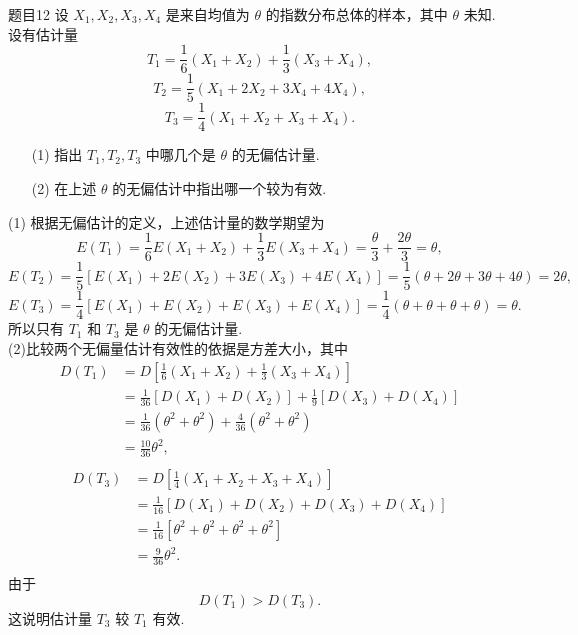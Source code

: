 \begin{question}{题目12}
    设 $X_1,X_2,X_3,X_4$ 是来自均值为 $\theta$ 的指数分布总体的样本，其中 $\theta$ 未知. 设有估计量
    $$
        T_1 = \frac{1}{6}(X_1 + X_2) + \frac{1}{3}(X_3 + X_4),
    $$
    $$
        T_2 = \frac{1}{5}(X_1 + 2X_2 + 3X_4 + 4X_4),
    $$
    $$
        T_3 = \frac{1}{4}(X_1 + X_2 + X_3 + X_4).
    $$
    \begin{enumerate}
        \item [(1)] 指出 $T_1, T_2, T_3$ 中哪几个是 $\theta$ 的无偏估计量.
        \item [(2)] 在上述 $\theta$ 的无偏估计中指出哪一个较为有效.
    \end{enumerate}
\end{question}
\begin{solution}
    (1) 根据无偏估计的定义，上述估计量的数学期望为
    $$
        E(T_1) = \frac{1}{6}E(X_1 + X_2) + \frac{1}{3}E(X_3 + X_4) = \frac{\theta}{3} + \frac{2\theta}{3} = \theta,
    $$
    $$
        E(T_2) = \frac{1}{5}[E(X_1) + 2E(X_2) + 3E(X_3) + 4E(X_4)]
        = \frac{1}{5}(\theta + 2\theta + 3\theta + 4\theta)
        = 2\theta,
    $$
    $$
        E(T_3) = \frac{1}{4}[E(X_1) + E(X_2) + E(X_3) + E(X_4)]
        = \frac{1}{4}(\theta+\theta+\theta+\theta)
        = \theta.
    $$
    所以只有 $T_1$ 和 $T_3$ 是 $\theta$ 的无偏估计量.\\
    (2)比较两个无偏量估计有效性的依据是方差大小，其中
    $$
        \begin{aligned}
            D(T_1)
             & = D\left[\frac{1}{6}(X_1+X_2) + \frac{1}{3}(X_3+X_4)\right]           \\
             & = \frac{1}{36}[D(X_1)+D(X_2)] + \frac{1}{9}[D(X_3) + D(X_4)]          \\
             & = \frac{1}{36}(\theta^2+\theta^2) + \frac{4}{36}(\theta^2 + \theta^2) \\
             & = \frac{10}{36}\theta^2,                                              \\
        \end{aligned}
    $$
    $$
        \begin{aligned}
            D(T_3)
             & = D\left[\frac{1}{4}(X_1+X_2+X_3+X_4)\right]              \\
             & = \frac{1}{16}[D(X_1) + D(X_2) + D(X_3) + D(X_4)]         \\
             & = \frac{1}{16}[\theta^2 + \theta^2 + \theta^2 + \theta^2] \\
             & = \frac{9}{36}\theta^2.                                   \\
        \end{aligned}
    $$
    由于
    $$
        D(T_1) > D(T_3).
    $$
    这说明估计量 $T_3$ 较 $T_1$ 有效.
\end{solution}
